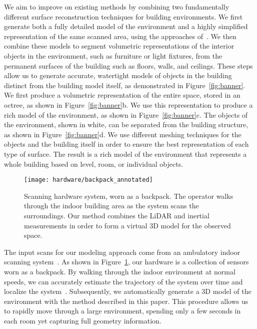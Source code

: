 \documentclass[review]{acmsiggraph}
\begin{document}
We aim to improve on existing methods by combining two fundamentally different surface reconstruction techniques for building environments.  We first generate both a fully detailed model of the environment and a highly simplified representation of the same scanned area, using the approaches of~\cite{Turner13,Turner14}.  We then combine these models to segment volumetric representations of the interior objects in the environment, such as furniture or light fixtures, from the permanent surfaces of the building such as floors, walls, and ceilings. These steps allow us to generate accurate, watertight models of objects in the building distinct from the building model itself, as demonstrated in Figure~\ref{fig:banner}.  We first produce a volumetric representation of the entire space, stored in an octree, as shown in Figure~\ref{fig:banner}b.  We use this representation to produce a rich model of the environment, as shown in Figure~\ref{fig:banner}c.  The objects of the environment, shown in white, can be separated from the building structure, as shown in Figure~\ref{fig:banner}d.  We use different meshing techniques for the objects and the building itself in order to ensure the best representation of each type of surface.  The result is a rich model of the environment that represents a whole building based on level, room, or individual objects.

\begin{figure}[t]
	\centerline{\texttt{[image: hardware/backpack\_annotated]}}
	\caption{Scanning hardware system, worn as a backpack.  The operator walks through the indoor building area as the system scans the surroundings.  Our method combines the LiDAR and inertial measurements in order to form a virtual 3D model for the observed space.}
	\label{fig:backpack}
\end{figure}

The input scans for our modeling approach come from an ambulatory indoor scanning system~\cite{Backpack}.  As shown in Figure~\ref{fig:backpack}, our hardware is a collection of sensors worn as a backpack.  By walking through the indoor environment at normal speeds, we can accurately estimate the trajectory of the system over time and localize the system~\cite{NickJournal}.  Subsequently, we automatically generate a 3D model of the environment with the method described in this paper.  This procedure allows us to rapidly move through a large environment, spending only a few seconds in each room yet capturing full geometry information.
\end{document}

